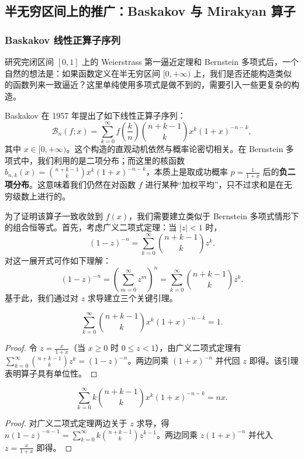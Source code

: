 \subsection{半无穷区间上的推广：Baskakov 与 Mirakyan 算子}

\subsubsection{Baskakov 线性正算子序列}

研究完闭区间 $[0,1]$ 上的 Weierstrass 第一逼近定理和 Bernstein 多项式后，一个自然的想法是：如果函数定义在半无穷区间 $[0, +\infty)$ 上，我们是否还能构造类似的函数列来一致逼近？这里单纯使用多项式是做不到的，需要引入一些更复杂的构造。

Baskakov 在 1957 年提出了如下线性正算子序列：
\[
\mathcal{B}_n(f;x) = \sum_{k=0}^{\infty} f\left( \frac{k}{n} \right) \binom{n+k-1}{k} x^k (1+x)^{-n-k},
\]
其中 $x \in [0, +\infty)$。这个构造的直观动机依然与概率论密切相关。在 Bernstein 多项式中，我们利用的是二项分布；而这里的核函数 $b_{n,k}(x) = \binom{n+k-1}{k} x^k (1+x)^{-n-k}$，本质上是取成功概率 $p = \frac{1}{1+x}$ 后的\textbf{负二项分布}。这意味着我们仍然在对函数 $f$ 进行某种“加权平均”，只不过求和是在无穷级数上进行的。

为了证明该算子一致收敛到 $f(x)$，我们需要建立类似于 Bernstein 多项式情形下的组合恒等式。首先，考虑广义二项式定理：当 $|z| < 1$ 时，
\[
(1-z)^{-n} = \sum_{k=0}^{\infty} \binom{n+k-1}{k} z^k.
\]
对这一展开式可作如下理解：
\[
(1-z)^{-n} = \left( \sum_{m=0}^{\infty} z^m \right)^n = \sum_{k=0}^{\infty} \binom{n+k-1}{k} z^k.
\]
基于此，我们通过对 $z$ 求导建立三个关键引理。

\begin{lemma}
\label{lem:baskakov1}
\[
\sum_{k=0}^{\infty} \binom{n+k-1}{k} x^k (1+x)^{-n-k} = 1.
\]
\end{lemma}
\begin{proof}
令 $z = \frac{x}{1+x}$（当 $x \geq 0$ 时 $0 \leq z < 1$），由广义二项式定理有 $\sum_{k=0}^{\infty} \binom{n+k-1}{k} z^k = (1-z)^{-n}$。两边同乘 $(1+x)^{-n}$ 并代回 $z$ 即得。该引理表明算子具有单位性。
\end{proof}

\begin{lemma}
\label{lem:baskakov2}
\[
\sum_{k=0}^{\infty} k \binom{n+k-1}{k} x^k (1+x)^{-n-k} = nx.
\]
\end{lemma}
\begin{proof}
对广义二项式定理两边关于 $z$ 求导，得 $n(1-z)^{-n-1} = \sum_{k=0}^{\infty} k \binom{n+k-1}{k} z^{k-1}$。两边同乘 $z(1+x)^{-n}$ 并代入 $z = \frac{x}{1+x}$ 即得。
\end{proof}

